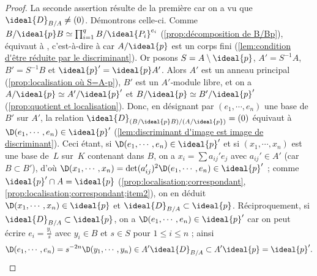 \documentclass[11pt, useosf,
  title in boldface,
  theorem in new line,
  theorem numbering = section,
  number theorems separately,
]{simplivre}
\begin{document}
    \begin{proof}
        La seconde assertion résulte de la première car on a vu que \( \ideal{D}_{B/A} \neq (0) \). Démontrons celle-ci. Comme \( B/\ideal{p}B \simeq \prod_{i=1}^q B/\ideal{P_i}^{e_i} \) (\cref{prop:décomposition de B/Bp}),  équivaut à , c'est-à-dire à  car \( A/\ideal{p} \) est un corps fini (\cref{lem:condition d'être réduite par le discriminant}). Or posons \( S = A \setminus \ideal{p} \), \( A' = S^{-1} A \), \( B' = S^{-1} B \) et \( \ideal{p}' = \ideal{p} A' \). Alors \( A' \) est un anneau principal (\cref{prop:localisation où S=A-p}), \( B' \) est un \( A' \)‑module libre, et on a \( A/\ideal{p} \simeq A'/\ideal{p}' \) et \( B/\ideal{p} \simeq B'/\ideal{p}' \) (\cref{prop:quotient et localisation}). Donc, en désignant par \( (e_1, \cdots, e_n) \) une base de \( B' \) sur \( A' \), la relation \( \ideal{D}_{(B/\ideal{p}B)/(A/\ideal{p})} = (0) \) équivaut à \( \D(e_1, \cdots, e_n) \in \ideal{p}' \) (\cref{lem:discriminant d'image est image de discriminant}). Ceci étant, si \( \D(e_1, \cdots, e_n) \in \ideal{p}' \) et si \( (x_1, \cdots, x_n) \) est une base de~\( L \) sur~\( K \) contenant dans \( B \), on a \( x_i = \sum a_{ij}' e_j \) avec \( a_{ij}' \in A' \) (car \( B \subset B' \)), d'où \( \D(x_1, \cdots, x_n) = \det(a_{ij}')^2 \D(e_1, \cdots, e_n) \in \ideal{p}' \) ; comme \( \ideal{p}' \cap A = \ideal{p} \) (\cref{prop:localisation;correspondant}, \ref{prop:localisation;correspondant;item2}), on en déduit \( \D(x_1, \cdots, x_n) \in \ideal{p} \) et \( \ideal{D}_{B/A} \subset \ideal{p} \). Réciproquement, si \( \ideal{D}_{B/A} \subset \ideal{p} \), on a \( \D(e_1, \cdots, e_n) \in \ideal{p}' \) car on peut écrire \( e_i = \frac{y_i}{s} \) avec \( y_i \in B \) et \( s \in S \) pour \( 1 \leqslant i \leqslant n \) ; ainsi
        \[
            \D(e_1, \cdots, e_n) = s^{-2n} \D(y_1, \cdots, y_n) \in A' \ideal{D}_{B/A} \subset A'\ideal{p} = \ideal{p}'.
            \qedhere
        \]
    \end{proof}
\end{document}
